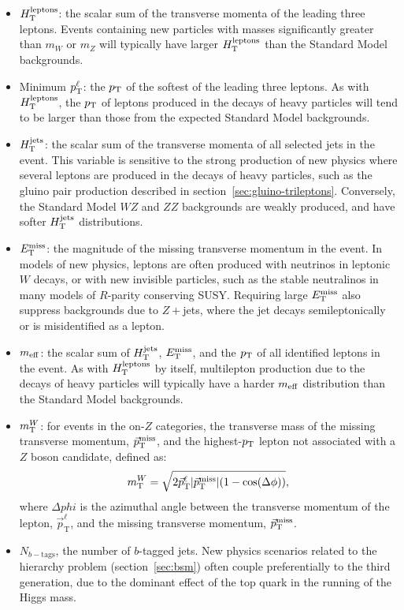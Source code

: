\begin{itemize}
	\item $H_{\mathrm{T}}^{\mathrm{leptons}}$: the scalar sum of the transverse momenta of the leading three leptons. Events containing new particles with masses significantly greater than $m_W$ or $m_Z$ will typically have larger $H_{\mathrm{T}}^{\mathrm{leptons}}$ than the Standard Model backgrounds.
	\item Minimum $p_{\text{T}}^{\ell}$: the $p_{\text{T}}$ of the softest of the leading three leptons. As with $H_{\mathrm{T}}^{\mathrm{leptons}}$, the $p_{\text{T}}$ of leptons produced in the decays of heavy particles will tend to be larger than those from the expected Standard Model backgrounds.
	\item $H_{\mathrm{T}}^{\mathrm{jets}}$: the scalar sum of the transverse momenta of all selected jets in the event. This variable is sensitive to the strong production of new physics where several leptons are produced in the decays of heavy particles, such as the gluino pair production described in section~\ref{sec:gluino-trileptons}. Conversely, the Standard Model $WZ$ and $ZZ$ backgrounds are weakly produced, and have softer $H_{\mathrm{T}}^{\mathrm{jets}}$ distributions.
	\item $E_{\text{T}}^{\text{miss}}$: the magnitude of the missing transverse momentum in the event. In models of new physics, leptons are often produced with neutrinos in leptonic $W$ decays, or with new invisible particles, such as the stable neutralinos in many models of $R$-parity conserving SUSY. Requiring large $E_{\text{T}}^{\text{miss}}$ also suppress backgrounds due to $Z+$jets, where the jet decays semileptonically or is misidentified as a lepton. 
	\item $m_{\mathrm{eff}}$: the scalar sum of $H_{\mathrm{T}}^{\mathrm{jets}}$, $E_{\text{T}}^{\text{miss}}$, and the $p_{\text{T}}$ of all identified leptons in the event. As with $H_{\mathrm{T}}^{\mathrm{leptons}}$ by itself, multilepton production due to the decays of heavy particles will typically have a harder $m_{\mathrm{eff}}$ distribution than the Standard Model backgrounds.
	\item $m_{\mathrm{T}}^W$: for events in the on-$Z$ categories, the transverse mass of the missing transverse momentum, $\vec{p}_{\mathrm{T}}^{\mathrm{miss}}$, and the highest-$p_{\text{T}}$ lepton not associated with a $Z$ boson candidate, defined as:
	\begin{equation}
		m_{\mathrm{T}}^W = \sqrt{2 \vec{p}_{\mathrm{T}}^{\ell}|\vec{p}_{\mathrm{T}}^{\mathrm{miss}}|(1-\cos(\Delta\phi))},
	\end{equation}
	where $\Delta phi$ is the azimuthal angle between the transverse momentum of the lepton, $\vec{p}_{\mathrm{T}}^{\ell}$, and the missing transverse momentum, $\vec{p}_{\mathrm{T}}^{\mathrm{miss}}$. 
	\item $N_{b-\mathrm{tags}}$, the number of $b$-tagged jets. New physics scenarios related to the hierarchy problem (section~\ref{sec:bsm}) often couple preferentially to the third generation, due to the dominant effect of the top quark in the running of the Higgs mass. 
\end{itemize}

